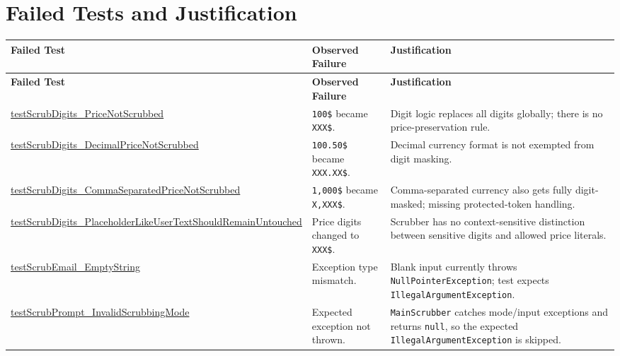 \documentclass[11pt]{article}
\begin{document}
\section*{Failed Tests and Justification}
\renewcommand{\arraystretch}{1.2}
\begin{longtable}{|>{\raggedright\arraybackslash}p{}|>{\raggedright\arraybackslash}p{}|>{\raggedright\arraybackslash}p{}|}
\hline
\textbf{Failed Test} & \textbf{Observed Failure} & \textbf{Justification} \\
\hline
\endfirsthead
\hline
\textbf{Failed Test} & \textbf{Observed Failure} & \textbf{Justification} \\
\hline
\endhead

\url{testScrubDigits_PriceNotScrubbed} & \texttt{100\$} became \texttt{XXX\$}. & Digit logic replaces all digits globally; there is no price-preservation rule. \\
\hline

\url{testScrubDigits_DecimalPriceNotScrubbed} & \texttt{100.50\$} became \texttt{XXX.XX\$}. & Decimal currency format is not exempted from digit masking. \\
\hline

\url{testScrubDigits_CommaSeparatedPriceNotScrubbed} & \texttt{1,000\$} became \texttt{X,XXX\$}. & Comma-separated currency also gets fully digit-masked; missing protected-token handling. \\
\hline

\url{testScrubDigits_PlaceholderLikeUserTextShouldRemainUntouched} & Price digits changed to \texttt{XXX\$}. & Scrubber has no context-sensitive distinction between sensitive digits and allowed price literals. \\
\hline

\url{testScrubEmail_EmptyString} & Exception type mismatch. & Blank input currently throws \texttt{NullPointerException}; test expects \texttt{IllegalArgumentException}. \\
\hline

\url{testScrubPrompt_InvalidScrubbingMode} & Expected exception not thrown. & \texttt{MainScrubber} catches mode/input exceptions and returns \texttt{null}, so the expected \texttt{IllegalArgumentException} is skipped. \\
\hline

\end{longtable}
\end{document}
